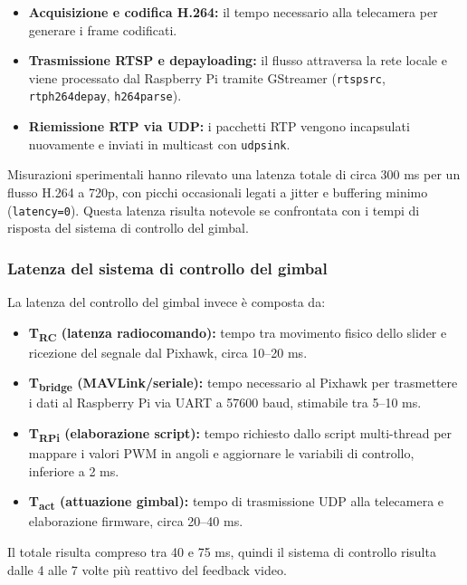 \begin{itemize}
    \item \textbf{Acquisizione e codifica H.264:} il tempo necessario alla telecamera per generare i frame codificati.  
    \item \textbf{Trasmissione RTSP e depayloading:} il flusso attraversa la rete locale e viene processato dal Raspberry Pi tramite GStreamer (\texttt{rtspsrc}, \texttt{rtph264depay}, \texttt{h264parse}).  
    \item \textbf{Riemissione RTP via UDP:} i pacchetti RTP vengono incapsulati nuovamente e inviati in multicast con \texttt{udpsink}.  
\end{itemize}

Misurazioni sperimentali hanno rilevato una latenza totale di circa 300 ms per un flusso H.264 a 720p, con picchi occasionali legati a jitter e buffering minimo (\texttt{latency=0}).  
Questa latenza risulta notevole se confrontata con i tempi di risposta del sistema di controllo del gimbal.

\subsubsection{Latenza del sistema di controllo del gimbal}

La latenza del controllo del gimbal invece è composta da:



\begin{itemize}
    \item \textbf{T\textsubscript{RC} (latenza radiocomando):} tempo tra movimento fisico dello slider e ricezione del segnale dal Pixhawk, circa 10–20 ms.  
    \item \textbf{T\textsubscript{bridge} (MAVLink/seriale):} tempo necessario al Pixhawk per trasmettere i dati al Raspberry Pi via UART a 57600 baud, stimabile tra 5–10 ms.  
    \item \textbf{T\textsubscript{RPi} (elaborazione script):} tempo richiesto dallo script multi-thread per mappare i valori PWM in angoli e aggiornare le variabili di controllo, inferiore a 2 ms.  
    \item \textbf{T\textsubscript{act} (attuazione gimbal):} tempo di trasmissione UDP alla telecamera e elaborazione firmware, circa 20–40 ms.
\end{itemize}

Il totale risulta compreso tra 40 e 75 ms, quindi il sistema di controllo risulta dalle 4 alle 7 volte più reattivo del feedback video.

